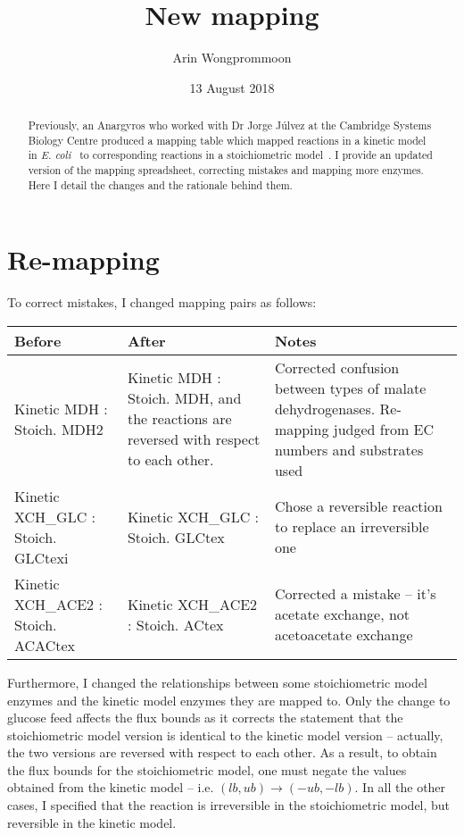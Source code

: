 \documentclass[parskip=full]{scrreprt}
\author{Arin Wongprommoon}
\title{New mapping}
\date{13 August 2018}
\begin{document}
\maketitle

\tableofcontents

\begin{abstract}
 Previously, an Anargyros who worked with Dr Jorge J\'ulvez at the Cambridge Systems Biology Centre produced a mapping table which mapped reactions in a kinetic model in \emph{E. coli}~\cite{millard_metabolic_2017} to corresponding reactions in a stoichiometric model~\cite{orth_comprehensive_2011}. I provide an updated version of the mapping spreadsheet, correcting mistakes and mapping more enzymes. Here I detail the changes and the rationale behind them.
\end{abstract}

\chapter{Re-mapping}
\label{ch:remapping}

To correct mistakes, I changed mapping pairs as follows:

\begin{tabularx}{\linewidth}{|L|L|L|}
  \hline
  Before & After & Notes\\
  \hline
  Kinetic MDH : Stoich. MDH2 & Kinetic MDH : Stoich. MDH, and the reactions are reversed with respect to each other. & Corrected confusion between types of malate dehydrogenases. Re-mapping judged from EC numbers and substrates used\\
  \hline
  Kinetic XCH\_GLC : Stoich. GLCtexi & Kinetic XCH\_GLC : Stoich. GLCtex & Chose a reversible reaction to replace an irreversible one\\
  \hline
  Kinetic XCH\_ACE2 : Stoich. ACACtex & Kinetic XCH\_ACE2 : Stoich. ACtex & Corrected a mistake -- it's acetate exchange, not acetoacetate exchange\\
  \hline
\end{tabularx}

Furthermore, I changed the relationships between some stoichiometric model enzymes and the kinetic model enzymes they are mapped to. Only the change to glucose feed affects the flux bounds as it corrects the statement that the stoichiometric model version is identical to the kinetic model version -- actually, the two versions are reversed with respect to each other. As a result, to obtain the flux bounds for the stoichiometric model, one must negate the values obtained from the kinetic model -- i.e. $(lb, ub) \rightarrow (-ub, -lb)$. In all the other cases, I specified that the reaction is irreversible in the stoichiometric model, but reversible in the kinetic model.
\end{document}
